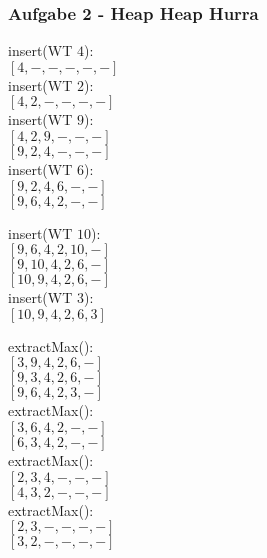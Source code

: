 \documentclass[11pt]{scrartcl}
\newcommand{\task}[1]{\subsubsection*{#1}}
\begin{document}
\task{Aufgabe 2 - Heap Heap Hurra}
\begin{minipage}{0.3\textwidth}
insert(WT $ 4 $):\\
$ [4, -, -, -, -, -] $\\
insert(WT $ 2 $):\\
$ [4, 2, -, -, -, -] $\\
insert(WT $ 9 $):\\
$ [4, 2, 9, -, -, -] $\\
$ [9, 2, 4, -, -, -] $\\
insert(WT $ 6 $):\\
$ [9, 2, 4, 6, -, -] $\\
$ [9, 6, 4, 2, -, -] $
\end{minipage}
\begin{minipage}{0.3\textwidth}
insert(WT $ 10 $):\\
$ [9, 6, 4, 2, 10, -] $\\
$ [9, 10, 4, 2, 6, -] $\\
$ [10, 9, 4, 2, 6, -] $\\
insert(WT $ 3 $):\\
$ [10, 9, 4, 2, 6, 3] $\\
\end{minipage}
\begin{minipage}{0.3\textwidth}
extractMax():\\
$ [3, 9, 4, 2, 6, -] $\\
$ [9, 3, 4, 2, 6, -] $\\
$ [9, 6, 4, 2, 3, -] $\\
extractMax():\\
$ [3, 6, 4, 2, -, -] $\\
$ [6, 3, 4, 2, -, -] $\\
extractMax():\\
$ [2, 3, 4, -, -, -] $\\
$ [4, 3, 2, -, -, -] $\\
extractMax():\\
$ [2, 3, -, -, -, -] $\\
$ [3, 2, -, -, -, -] $
\end{minipage}
\end{document}
